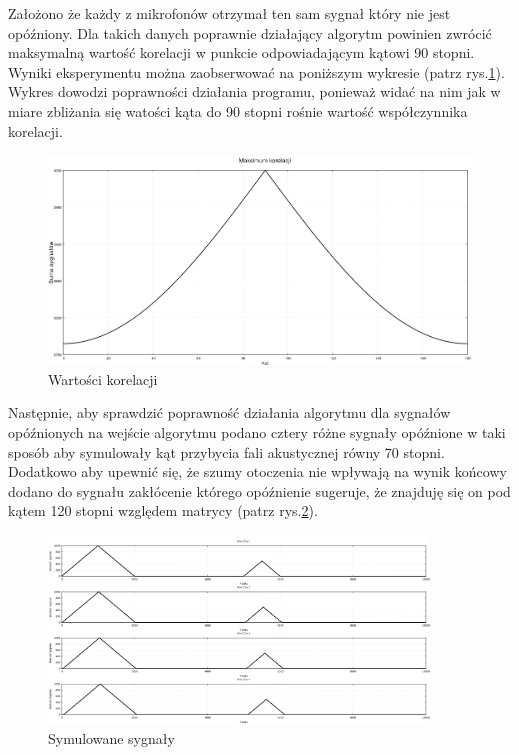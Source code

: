 \documentclass[eng,printmode]{mgr}
\begin{document}
\newpage

Założono że każdy z mikrofonów otrzymał ten sam sygnał który nie jest opóźniony. Dla takich danych poprawnie działający algorytm powinien zwrócić maksymalną wartość korelacji w punkcie odpowiadającym kątowi 90 stopni. Wyniki eksperymentu można zaobserwować na poniższym wykresie
(patrz rys.\ref{fig-suma}). Wykres dowodzi poprawności działania programu, ponieważ widać na nim jak w miare zbliżania się watości kąta do 90 stopni rośnie wartość współczynnika korelacji.

\begin{figure}[!ht]

    \centering

  \includegraphics[width=1\textwidth, angle=0]{suma.png}

    \caption{Wartości korelacji}
 \label{fig-suma}
    

\end{figure}


Następnie, aby sprawdzić poprawność działania algorytmu dla sygnałów opóźnionych na wejście algorytmu podano cztery różne sygnały opóźnione w taki sposób aby symulowały kąt przybycia fali akustycznej równy 70 stopni. Dodatkowo aby upewnić się, że szumy otoczenia nie wpływają na wynik końcowy dodano do sygnału zakłócenie którego opóźnienie sugeruje, że znajduję się on pod kątem 120 stopni względem matrycy (patrz rys.\ref{fig-opoznienia}). 

\begin{figure}[!ht]

    \centering

  \includegraphics[width=0.9\textwidth, angle=0]{sygnaly.png}

    \caption{Symulowane sygnały}
 \label{fig-opoznienia}
    

\end{figure}
\end{document}
